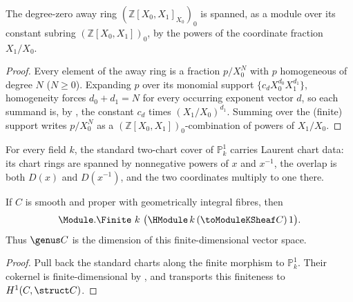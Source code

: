 \begin{theorem}
  \label{thm:adelic_span_p1CoordAway_pow_top}
  \leanok
  The degree-zero away ring \((\mathbb{Z}[X_0,X_1]_{X_0})_0\) is spanned,
  as a module over its constant subring \((\mathbb{Z}[X_0,X_1])_0\), by
  the powers of the coordinate fraction \(X_1/X_0\).
\end{theorem}
\begin{proof}
  \leanok
  Every element of the away ring is a fraction \(p/X_0^N\) with \(p\)
  homogeneous of degree \(N\) (\(N \ge 0\)). Expanding \(p\) over its
  monomial support \(\{c_d X_0^{d_0} X_1^{d_1}\}\), homogeneity forces
  \(d_0 + d_1 = N\) for every occurring exponent vector \(d\), so each
  summand is, by , the constant
  \(c_d\) times \((X_1/X_0)^{d_1}\). Summing over the (finite) support
  writes \(p/X_0^N\) as a \((\mathbb{Z}[X_0,X_1])_0\)-combination of
  powers of \(X_1/X_0\).
\end{proof}

\begin{theorem}
  \label{thm:adelic_P1_laurent_chart_data}
  \leanok
  For every field \(k\), the standard two-chart cover of
  \(\mathbb P^1_k\) carries Laurent chart data: its chart rings are
  spanned by nonnegative powers of \(x\) and \(x^{-1}\), the overlap is
  both \(D(x)\) and \(D(x^{-1})\), and the two coordinates multiply to
  one there.
\end{theorem}

\begin{theorem}
  \label{thm:adelic_module_finite_genus}
  \leanok
  If \(C\) is smooth and proper with geometrically integral fibres, then
  \[
    \Module.\Finite\ k\ \bigl(\HModule\, k\, (\toModuleKSheaf C)\, 1\bigr).
  \]
  Thus \(\genus C\) is the dimension of this finite-dimensional vector
  space.
\end{theorem}
\begin{proof}
  \leanok
  Pull back the standard charts along the finite morphism to
  \(\mathbb P^1_k\).  Their cokernel is finite-dimensional by
  , and
   transports this
  finiteness to \(H^1(C,\struct C)\).
\end{proof}

